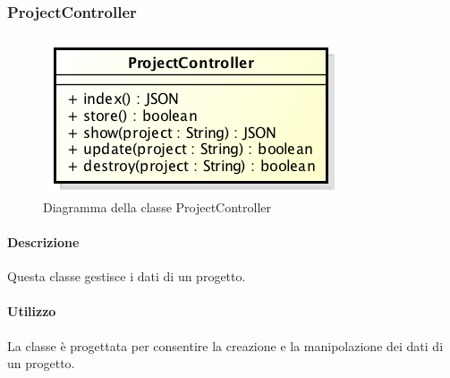 \newpage
\subsubsection{ProjectController}
\begin{figure}[h]
\centering
\includegraphics[width=0.5\linewidth]{img/back_end_http_controllers_projectController}
\caption[Diagramma della classe ProjectController]{Diagramma della classe ProjectController}
\label{fig:back_end_http_controllers_projectController}
\end{figure}

	\paragraph{Descrizione}
		Questa classe gestisce i dati di un progetto.
	\paragraph{Utilizzo}
		La classe è progettata per consentire la creazione e la manipolazione dei dati di un progetto.
		
